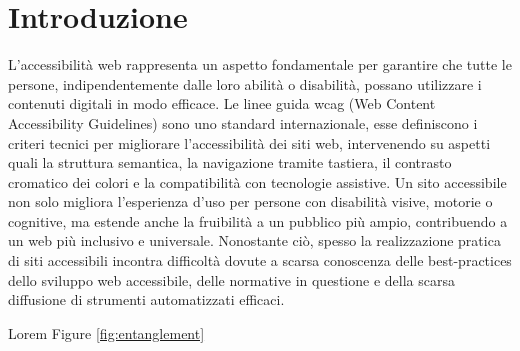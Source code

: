 \chapter{Introduzione}
\label{chap:intro}


\noindent L’accessibilità web rappresenta un aspetto fondamentale per garantire che tutte le persone, indipendentemente dalle loro abilità o disabilità, possano utilizzare i contenuti digitali in modo efficace. Le linee guida \acrshort{wcag} (Web Content Accessibility Guidelines) sono uno standard internazionale, esse definiscono i criteri tecnici per migliorare l’accessibilità dei siti web, intervenendo su aspetti quali la struttura semantica, la navigazione tramite tastiera, il contrasto cromatico dei colori e la compatibilità con tecnologie assistive. 
Un sito accessibile non solo migliora l’esperienza d’uso per persone con disabilità visive, motorie o cognitive, ma estende anche la fruibilità a un pubblico più ampio, contribuendo a un web più inclusivo e universale. 
Nonostante ciò, spesso la realizzazione pratica di siti accessibili incontra difficoltà dovute a scarsa conoscenza delle best-practices dello sviluppo web accessibile, delle normative in questione e della scarsa diffusione di strumenti automatizzati efficaci.


Lorem Figure \ref{fig:entanglement}





